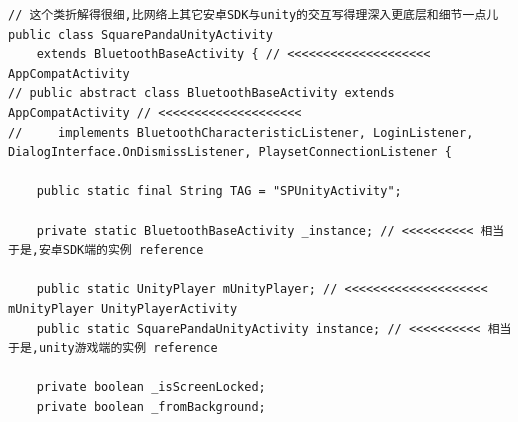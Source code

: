 \documentclass[9pt, b5paper]{article}
\begin{document}
\begin{verbatim}
// 这个类折解得很细,比网络上其它安卓SDK与unity的交互写得理深入更底层和细节一点儿
public class SquarePandaUnityActivity
    extends BluetoothBaseActivity { // <<<<<<<<<<<<<<<<<<<< AppCompatActivity
// public abstract class BluetoothBaseActivity extends AppCompatActivity // <<<<<<<<<<<<<<<<<<<< 
//     implements BluetoothCharacteristicListener, LoginListener, DialogInterface.OnDismissListener, PlaysetConnectionListener {
    
    public static final String TAG = "SPUnityActivity";

    private static BluetoothBaseActivity _instance; // <<<<<<<<<< 相当于是,安卓SDK端的实例 reference

    public static UnityPlayer mUnityPlayer; // <<<<<<<<<<<<<<<<<<<< mUnityPlayer UnityPlayerActivity
    public static SquarePandaUnityActivity instance; // <<<<<<<<<< 相当于是,unity游戏端的实例 reference

    private boolean _isScreenLocked;
    private boolean _fromBackground;


\end{verbatim}
\end{document}
